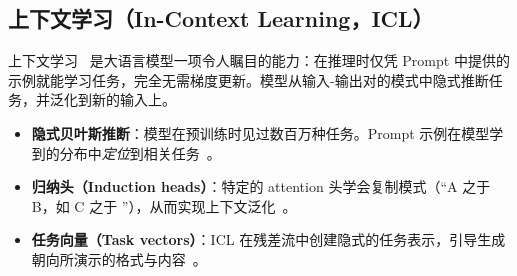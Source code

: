 \subsection{上下文学习（In-Context Learning，ICL）}
\label{in-context-learning-icl}

上下文学习~\cite{brown2020language} 是大语言模型一项令人瞩目的能力：在推理时仅凭 Prompt 中提供的示例就能学习任务，完全无需梯度更新。模型从输入-输出对的模式中隐式推断任务，并泛化到新的输入上。

\begin{keybox}[为什么上下文学习有效]
\begin{itemize}
  \item \textbf{隐式贝叶斯推断}：模型在预训练时见过数百万种任务。Prompt 示例在模型学到的分布中\emph{定位}到相关任务~\cite{xie2022explanation}。
  \item \textbf{归纳头（Induction heads）}：特定的 attention 头学会复制模式（``A 之于 B，如 C 之于 ''），从而实现上下文泛化~\cite{olsson2022context}。
  \item \textbf{任务向量（Task vectors）}：ICL 在残差流中创建隐式的任务表示，引导生成朝向所演示的格式与内容~\cite{todd2024function}。
\end{itemize}
\end{keybox}

